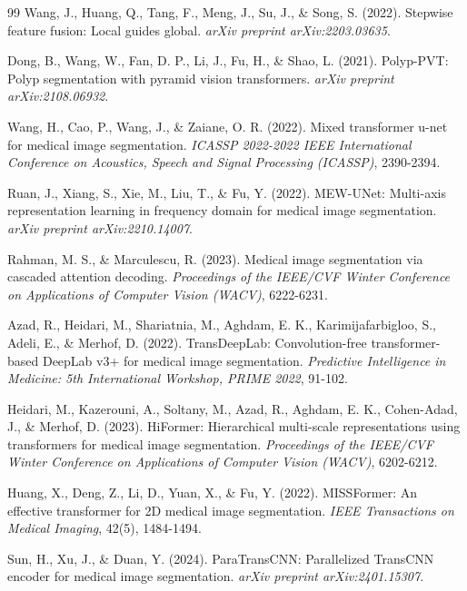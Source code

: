 \documentclass[runningheads]{llncs}
\begin{document}
\begin{thebibliography}{99}
Wang, J., Huang, Q., Tang, F., Meng, J., Su, J., \& Song, S. (2022). Stepwise feature fusion: Local guides global. \textit{arXiv preprint arXiv:2203.03635}.

Dong, B., Wang, W., Fan, D. P., Li, J., Fu, H., \& Shao, L. (2021). Polyp-PVT: Polyp segmentation with pyramid vision transformers. \textit{arXiv preprint arXiv:2108.06932}.

Wang, H., Cao, P., Wang, J., \& Zaiane, O. R. (2022). Mixed transformer u-net for medical image segmentation. \textit{ICASSP 2022-2022 IEEE International Conference on Acoustics, Speech and Signal Processing (ICASSP)}, 2390-2394.

Ruan, J., Xiang, S., Xie, M., Liu, T., \& Fu, Y. (2022). MEW-UNet: Multi-axis representation learning in frequency domain for medical image segmentation. \textit{arXiv preprint arXiv:2210.14007}.

Rahman, M. S., \& Marculescu, R. (2023). Medical image segmentation via cascaded attention decoding. \textit{Proceedings of the IEEE/CVF Winter Conference on Applications of Computer Vision (WACV)}, 6222-6231.

Azad, R., Heidari, M., Shariatnia, M., Aghdam, E. K., Karimijafarbigloo, S., Adeli, E., \& Merhof, D. (2022). TransDeepLab: Convolution-free transformer-based DeepLab v3+ for medical image segmentation. \textit{Predictive Intelligence in Medicine: 5th International Workshop, PRIME 2022}, 91-102.

Heidari, M., Kazerouni, A., Soltany, M., Azad, R., Aghdam, E. K., Cohen-Adad, J., \& Merhof, D. (2023). HiFormer: Hierarchical multi-scale representations using transformers for medical image segmentation. \textit{Proceedings of the IEEE/CVF Winter Conference on Applications of Computer Vision (WACV)}, 6202-6212.

Huang, X., Deng, Z., Li, D., Yuan, X., \& Fu, Y. (2022). MISSFormer: An effective transformer for 2D medical image segmentation. \textit{IEEE Transactions on Medical Imaging}, 42(5), 1484-1494.

Sun, H., Xu, J., \& Duan, Y. (2024). ParaTransCNN: Parallelized TransCNN encoder for medical image segmentation. \textit{arXiv preprint arXiv:2401.15307}.




\end{thebibliography}
\end{document}

